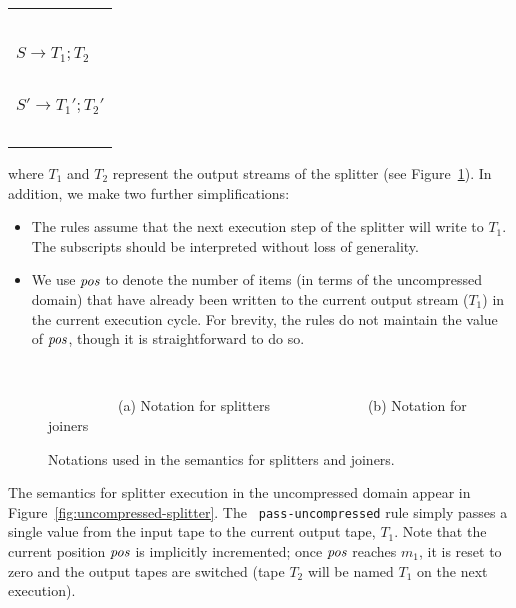 \hspace{-12pt}\begin{tabular}{l} ~ \vspace{-6pt} \\ 
\hspace{-3pt}$S \rightarrow T_1; T_2$ \hspace{-7pt}~\vspace{0.5pt} \\ \hline ~ \vspace{-7.5pt} \\
\hspace{-3pt}$S' \rightarrow T_1'; T_2'$ \hspace{-7pt} \\ ~ \vspace{-6pt} \\
\end{tabular}

\noindent where $T_1$ and $T_2$ represent the output streams of the
splitter (see Figure~\ref{fig:sj-pic}).  In addition, we make two
further simplifications:
\begin{itemize}

\item The rules assume that the next execution step of the splitter
  will write to $T_1$.  The subscripts should be interpreted without
  loss of generality.

\item We use $\mbox{\it pos}$ to denote the number of items (in terms of the
  uncompressed domain) that have already been written to the current
  output stream ($T_1$) in the current execution cycle.  For brevity,
  the rules do not maintain the value of $\mbox{\it pos}$, though it is
  straightforward to do so.

\end{itemize}

\begin{figure}[t]
~~~~~~~~~

\mbox{~~~~~~~~~~}(a) Notation for splitters~~~~~~~~~~~~~~(b) Notation for joiners
\caption{Notations used in the semantics for splitters and joiners.
\protect\label{fig:sj-pic}}
\end{figure}

The semantics for splitter execution in the uncompressed domain appear
in Figure~\ref{fig:uncompressed-splitter}.  The {\tt
  pass-uncompressed} rule simply passes a single value from the input
tape to the current output tape, $T_1$.  Note that the current
position $\mbox{\it pos}$ is implicitly incremented; once $\mbox{\it pos}$ reaches $m_1$,
it is reset to zero and the output tapes are switched (tape $T_2$ will
be named $T_1$ on the next execution).

